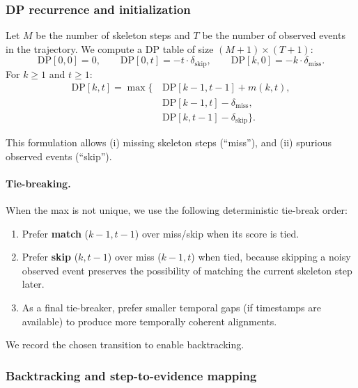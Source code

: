 \documentclass{article}
\begin{document}
\subsubsection{DP recurrence and initialization}
\label{sec:app_alignment_dp}

Let $M$ be the number of skeleton steps and $T$ be the number of observed events in the trajectory.
We compute a DP table of size $(M{+}1)\times (T{+}1)$:
\begin{equation}
\mathrm{DP}[0,0]=0,\qquad
\mathrm{DP}[0,t]=-t\cdot\delta_{\mathrm{skip}},\qquad
\mathrm{DP}[k,0]=-k\cdot\delta_{\mathrm{miss}}.
\end{equation}
For $k\ge 1$ and $t\ge 1$:
\begin{equation}
\begin{aligned}
\mathrm{DP}[k,t] = \max\Big\{\, &
\mathrm{DP}[k-1,t-1] + m(k,t), \\
& \mathrm{DP}[k-1,t] - \delta_{\mathrm{miss}}, \\
& \mathrm{DP}[k,t-1] - \delta_{\mathrm{skip}}
\Big\}.
\end{aligned}
\end{equation}

This formulation allows (i) missing skeleton steps (``miss''), and (ii) spurious observed events (``skip'').

\paragraph{Tie-breaking.}
When the max is not unique, we use the following deterministic tie-break order:
\begin{enumerate}
    \item Prefer \textbf{match} ($k{-}1,t{-}1$) over miss/skip when its score is tied.
    \item Prefer \textbf{skip} ($k,t{-}1$) over miss ($k{-}1,t$) when tied, because skipping a noisy observed event preserves the possibility of matching the current skeleton step later.
    \item As a final tie-breaker, prefer smaller temporal gaps (if timestamps are available) to produce more temporally coherent alignments.
\end{enumerate}
We record the chosen transition to enable backtracking.

\subsubsection{Backtracking and step-to-evidence mapping}
\label{sec:app_alignment_backtrack}
\end{document}
